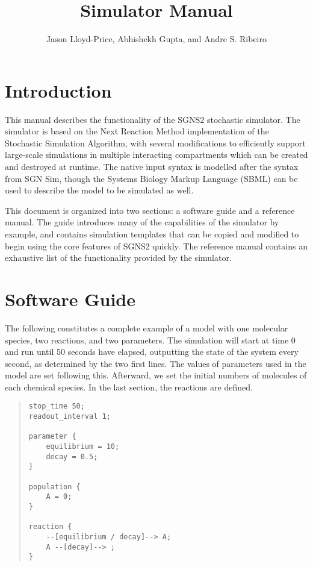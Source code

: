 \documentclass[10pt]{article}
\author{Jason Lloyd-Price, Abhishekh Gupta, and Andre S. Ribeiro}
\title{{\programname} Simulator Manual}
\newcommand{\programname}{SGNS2}
\begin{document}
\maketitle

\tableofcontents

\section{Introduction}

This manual describes the functionality of the {\programname} stochastic simulator. The simulator is based on the Next Reaction Method\cite{Gibson2000} implementation of the Stochastic Simulation Algorithm\cite{Gillespie1977}, with several modifications to efficiently support large-scale simulations in multiple interacting compartments which can be created and destroyed at runtime. The native input syntax is modelled after the syntax from SGN Sim\cite{Ribeiro2007}, though the Systems Biology Markup Language (SBML) can be used to describe the model to be simulated as well.

This document is organized into two sections: a software guide and a reference manual. The guide introduces many of the capabilities of the simulator by example, and contains simulation templates that can be copied and modified to begin using the core features of {\programname} quickly. The reference manual contains an exhaustive list of the functionality provided by the simulator.

\section{Software Guide}

The following constitutes a complete example of a model with one molecular species, two reactions, and two parameters. The simulation will start at time 0 and run until 50 seconds have elapsed, outputting the state of the system every second, as determined by the two first lines. The values of parameters used in the model are set following this. Afterward, we set the initial numbers of molecules of each chemical species. In the last section, the reactions are defined.

\begin{quote}
\begin{verbatim}
stop_time 50;
readout_interval 1;

parameter {
    equilibrium = 10;
    decay = 0.5;
}

population {
    A = 0;
}

reaction {
    --[equilibrium / decay]--> A;
    A --[decay]--> ;
}
\end{verbatim}
\end{quote}
\end{document}
